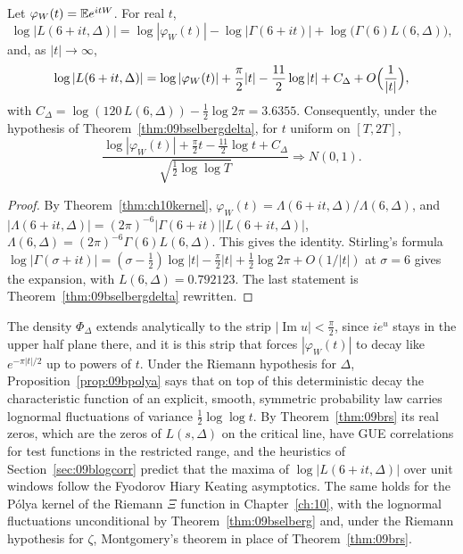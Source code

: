 \begin{proposition}\label{prop:09bpolya}
Let $\varphi_W(t)=\mathbb{E} e^{itW}$. For real $t$,
\[
\log|L(6+it,\Delta)|=\log|\varphi_W(t)|-\log|\Gamma(6+it)|+\log\bigl(\Gamma(6)L(6,\Delta)\bigr),
\]
and, as $|t|\to\infty$,
\[
\log|L(6+it,\Delta)|=\log|\varphi_W(t)|+\frac\pi2|t|-\frac{11}2\log|t|+C_\Delta+O\Bigl(\frac1{|t|}\Bigr),
\]
with $C_\Delta=\log(120\,L(6,\Delta))-\frac12\log2\pi=3.6355$.
Consequently, under the hypothesis of Theorem~\ref{thm:09bselbergdelta}, for $t$ uniform on $[T,2T]$,
\[
\frac{\log|\varphi_W(t)|+\frac\pi2t-\frac{11}2\log t+C_\Delta}{\sqrt{\frac12\log\log T}}\Longrightarrow N(0,1).
\]
\end{proposition}

\begin{proof}
By Theorem~\ref{thm:ch10kernel}, $\varphi_W(t)=\Lambda(6+it,\Delta)/\Lambda(6,\Delta)$, and $|\Lambda(6+it,\Delta)|=(2\pi)^{-6}|\Gamma(6+it)||L(6+it,\Delta)|$, $\Lambda(6,\Delta)=(2\pi)^{-6}\Gamma(6)L(6,\Delta)$. This gives the identity. Stirling's formula $\log|\Gamma(\sigma+it)|=(\sigma-\frac12)\log|t|-\frac\pi2|t|+\frac12\log2\pi+O(1/|t|)$ at $\sigma=6$ gives the expansion, with $L(6,\Delta)=0.792123$. The last statement is Theorem~\ref{thm:09bselbergdelta} rewritten.
\end{proof}

The density $\Phi_\Delta$ extends analytically to the strip $|\operatorname{Im}u|<\frac\pi2$, since $ie^{u}$ stays in the upper half plane there, and it is this strip that forces $|\varphi_W(t)|$ to decay like $e^{-\pi|t|/2}$ up to powers of $t$. Under the Riemann hypothesis for $\Delta$, Proposition~\ref{prop:09bpolya} says that on top of this deterministic decay the characteristic function of an explicit, smooth, symmetric probability law carries lognormal fluctuations of variance $\frac12\log\log t$. By Theorem~\ref{thm:09brs} its real zeros, which are the zeros of $L(s,\Delta)$ on the critical line, have GUE correlations for test functions in the restricted range, and the heuristics of Section~\ref{sec:09blogcorr} predict that the maxima of $\log|L(6+it,\Delta)|$ over unit windows follow the Fyodorov Hiary Keating asymptotics. The same holds for the P\'olya kernel of the Riemann $\Xi$ function in Chapter~\ref{ch:10}, with the lognormal fluctuations unconditional by Theorem~\ref{thm:09bselberg} and, under the Riemann hypothesis for $\zeta$, Montgomery's theorem in place of Theorem~\ref{thm:09brs}.

